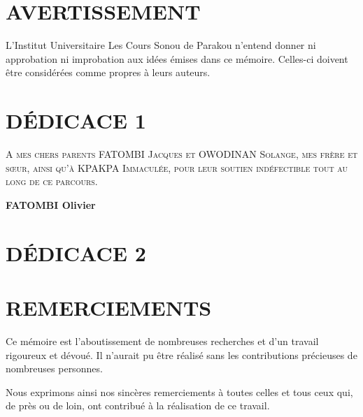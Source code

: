 \documentclass[a4paper,12pt]{report}
\begin{document}
    \chapter*{AVERTISSEMENT}
    
    \begin{mdframed}[
        backgroundcolor=white,
        linecolor=black,
        linewidth=1pt,
        roundcorner=5pt,
        innertopmargin=10pt,
        innerbottommargin=10pt,
        innerleftmargin=10pt,
        innerrightmargin=10pt
        ]
        \centering
        L’Institut Universitaire Les Cours Sonou de Parakou n’entend donner ni approbation ni improbation aux idées émises dans ce mémoire. Celles-ci doivent être considérées comme propres à leurs auteurs.
        
    \end{mdframed}
    
    \chapter*{DÉDICACE 1}
    
    \lettrine{A}{ mes chers parents FATOMBI Jacques et OWODINAN Solange, mes frère et sœur, ainsi qu’à KPAKPA Immaculée, pour leur soutien indéfectible tout au long de ce parcours.}
    
    \vspace{2cm}
    
    \begin{flushright}
        \large\bfseries{FATOMBI Olivier}
    \end{flushright}
    
    \chapter*{DÉDICACE 2}
    
    \chapter*{REMERCIEMENTS}
    
    Ce mémoire est l’aboutissement de nombreuses recherches et d’un travail rigoureux et dévoué. Il n’aurait pu être réalisé sans les contributions précieuses de nombreuses personnes.
    
    Nous exprimons ainsi nos sincères remerciements à toutes celles et tous ceux qui, de près ou de loin, ont contribué à la réalisation de ce travail.
    
\end{document}
